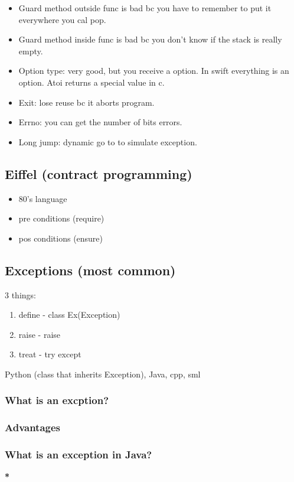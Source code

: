\documentclass[11pt]{article}
\begin{document}
\begin{itemize}
\item Guard method outside func is bad bc you have to remember to put it everywhere you cal pop.
\item Guard method inside func is bad bc you don't know if the stack is really empty.
\item Option type: very good, but you receive a option. In swift everything is an
option. Atoi returns a special value in c.
\item Exit: lose reuse bc it aborts program.
\item Errno: you can get the number of bits errors.
\item Long jump: dynamic go to to simulate exception.
\end{itemize}
\subsection{Eiffel (contract programming)}
\label{sec:org687b1a8}
\begin{itemize}
\item 80's language
\item pre conditions (require)
\item pos conditions (ensure)
\end{itemize}



\subsection{Exceptions (most common)}
\label{sec:org08b541d}
3 things:
\begin{enumerate}
\item define - class Ex(Exception)
\item raise - raise
\item treat - try except
\end{enumerate}

Python (class that inherits Exception), Java, cpp, sml
\subsubsection{What is an excption?}
\label{sec:org7fcb602}
\subsubsection{Advantages}
\label{sec:orgf4b4152}
\subsubsection{What is an exception in Java?}
\label{sec:orgdd3a382}
\textbf{*}
\end{document}
